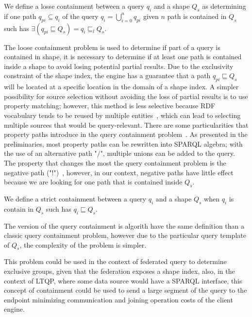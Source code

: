 \begin{definition}\label{def:looseContainment}
We define a losse containment between a query $q_i$ and a shape $Q_s$ as determining if one path $q_{pi} \subseteq q_i$ of the query $q_i = \bigcup_{i=0}^{n} q_{pi}$ given $n$ path is contained in 
$Q_s$ such has $\exists (q_{pi} \sqsubseteq  Q_s) = q_{i} \sqsubseteq_l  Q_s$.
\end{definition}

The loose containment problem is used to determine if part of a query is contained in shape,
it is necessary to determine if at least one path is contained inside a shape to avoid losing potential partial results.
Due to the exclusivity constraint of the shape index, the engine has a guarantee that a path $q_{pi} \sqsubseteq Q_s$ will be located at a specific location in the domain of a shape index.
A simpler possibility for source selection without avoiding the loss of partial results is to use property matching;
however, this method is less selective because RDF vocabulary tends to be reused by multiple entities~\cite{Stuckenschmidt2004, Harth2010},
which can lead to selecting multiple sources that would be query-relevant.
There are some particularities that property paths introduce in the query containment problem~\cite{Kostylev2015}.
As presented in the preliminaries, most property paths can be rewritten into SPARQL algebra; with the use of an alternative path "$/$", multiple unions can be added to the query.
The property that changes the most the query containment problem is the negative path ("$!$")~\cite{Kostylev2015},
however, in our context, negative paths have little effect because we are looking for one path that is contained inside $Q_s$.

\iffalse
LET MAKE AN ALGORITHM and analyse the complexity
\fi


\begin{definition}\label{def:strictContainment}
We define a strict containment between a query $q_i$ and a shape $Q_s$ when $q_i$ is contain in $Q_s$ such has $q_{i} \sqsubseteq Q_s$.
\end{definition}

The version of the query containment is algorith have the same definition than a classic query containment problem, however due to the 
particular query template of $Q_s$, the complexity of the problem is simpler.

This problem could be used in the context of federated query to determine exclusive groups, given that the federation exposes a shape index, 
also, in the context of LTQP, where some data source would have a SPARQL interface, this concept of containment could be used to send a large segment of the query to the endpoint 
minimizing communication and joining operation costs of the client engine.

